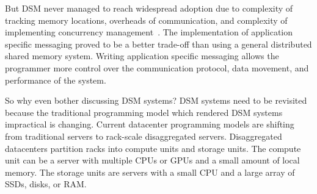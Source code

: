 But DSM never managed to reach widespread adoption due to complexity of tracking memory locations, overheads of communication, and complexity of implementing concurrency management~\cite{Li1989}. The implementation of application specific messaging proved to be a better trade-off than using a general distributed shared memory system. Writing application specific messaging allows the programmer more control over the communication protocol, data movement, and performance of the system. 

So why even bother discussing DSM systems? DSM systems need to be revisited because the traditional programming model which rendered DSM systems impractical is changing. Current datacenter programming models are shifting from traditional servers to rack-scale disaggregated servers. Disaggregated datacenters partition racks into compute units and storage units. The compute unit can be a server with multiple CPUs or GPUs and a small amount of local memory. The storage units are servers with a small CPU and a large array of SSDs, disks, or RAM.~\cite{Li2017}

